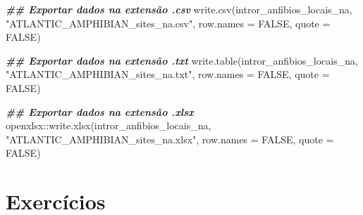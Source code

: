\documentclass[
]{book}
\newenvironment{Shaded}{\begin{snugshade}}{\end{snugshade}}
\newcommand{\AttributeTok}[1]{\textcolor[rgb]{0.61,0.61,0.61}{#1}}
\newcommand{\ConstantTok}[1]{\textcolor[rgb]{0,0,0}{#1}}
\newcommand{\DocumentationTok}[1]{\textcolor[rgb]{0.37,0.37,0.37}{\textbf{\textit{#1}}}}
\newcommand{\FunctionTok}[1]{\textcolor[rgb]{0,0,0}{#1}}
\newcommand{\NormalTok}[1]{#1}
\newcommand{\SpecialCharTok}[1]{\textcolor[rgb]{0,0,0}{#1}}
\newcommand{\StringTok}[1]{\textcolor[rgb]{0.5,0.5,0.5}{#1}}
\begin{document}
\begin{Shaded}
\begin{Highlighting}[]
\DocumentationTok{\#\# Exportar dados na extensão .csv}
\FunctionTok{write.csv}\NormalTok{(intror\_anfibios\_locais\_na, }\StringTok{"ATLANTIC\_AMPHIBIAN\_sites\_na.csv"}\NormalTok{, }
          \AttributeTok{row.names =} \ConstantTok{FALSE}\NormalTok{, }\AttributeTok{quote =} \ConstantTok{FALSE}\NormalTok{)}

\DocumentationTok{\#\# Exportar dados na extensão .txt}
\FunctionTok{write.table}\NormalTok{(intror\_anfibios\_locais\_na, }\StringTok{"ATLANTIC\_AMPHIBIAN\_sites\_na.txt"}\NormalTok{, }
            \AttributeTok{row.names =} \ConstantTok{FALSE}\NormalTok{, }\AttributeTok{quote =} \ConstantTok{FALSE}\NormalTok{)}

\DocumentationTok{\#\# Exportar dados na extensão .xlsx}
\NormalTok{openxlsx}\SpecialCharTok{::}\FunctionTok{write.xlsx}\NormalTok{(intror\_anfibios\_locais\_na, }\StringTok{"ATLANTIC\_AMPHIBIAN\_sites\_na.xlsx"}\NormalTok{, }
                     \AttributeTok{row.names =} \ConstantTok{FALSE}\NormalTok{, }\AttributeTok{quote =} \ConstantTok{FALSE}\NormalTok{)}
\end{Highlighting}
\end{Shaded}

\hypertarget{exercuxedcios}{%
\section{Exercícios}\label{exercuxedcios}}
\end{document}
